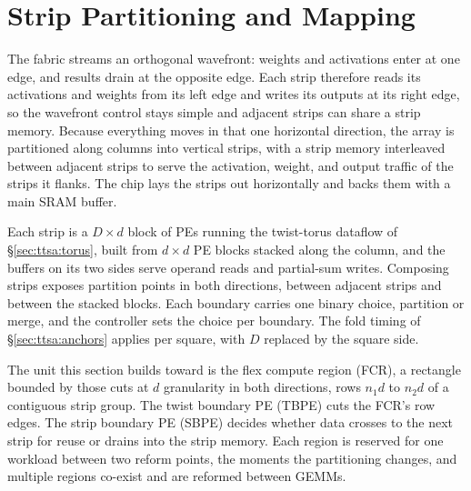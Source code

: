 \section{Strip Partitioning and Mapping}

\label{sec:design}






The fabric streams an orthogonal wavefront: weights and activations
enter at one edge, and results drain at the opposite edge. Each strip
therefore reads its activations and weights from its left edge and
writes its outputs at its right edge, so the wavefront control stays
simple and adjacent strips can share a strip memory. Because
everything moves in that one horizontal direction, the array is
partitioned along columns into vertical strips, with a strip memory
interleaved between adjacent strips to serve the activation, weight,
and output traffic of the strips it flanks. The chip lays the strips
out horizontally and backs them with a main SRAM buffer.

Each strip is a $D{\times}d$ block of PEs running the twist-torus
dataflow of \S\ref{sec:ttsa:torus}, built from $d{\times}d$ PE
blocks stacked along the column, and the buffers on its two sides
serve operand reads and partial-sum writes. Composing strips
exposes partition points in both directions, between adjacent strips and
between the stacked blocks. Each boundary carries one binary
choice, partition or merge, and the controller sets the choice per
boundary. The fold timing of \S\ref{sec:ttsa:anchors} applies per
square, with $D$ replaced by the square side.

The unit this section builds toward is the flex compute region
(FCR), a rectangle bounded by those cuts at $d$ granularity in
both directions, rows $n_1 d$ to $n_2 d$ of a contiguous strip
group. The twist boundary PE (TBPE) cuts the FCR's row edges. The
strip boundary PE (SBPE) decides whether data crosses to the next
strip for reuse or drains into the strip memory. Each region is
reserved for one workload between two reform points, the moments
the partitioning changes, and multiple regions co-exist and are
reformed between GEMMs.

